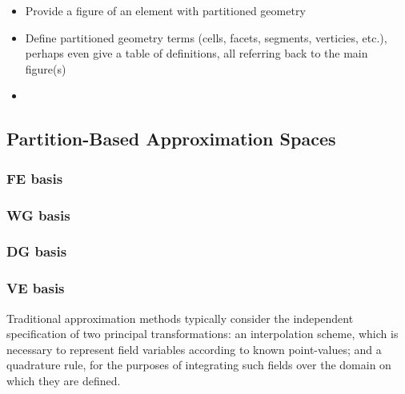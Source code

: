 \begin{itemize}
	\item Provide a figure of an element with partitioned geometry
	\item Define partitioned geometry terms (cells, facets, segments, verticies, etc.), perhaps even give a table of definitions, all referring back to the main figure(s)
	\item 
\end{itemize}

\subsection{Partition-Based Approximation Spaces}

		\subsubsection*{FE basis}
		\subsubsection*{WG basis}
		\subsubsection*{DG basis}
		\subsubsection*{VE basis}

Traditional approximation methods typically consider the independent specification of two principal transformations: an interpolation scheme, which is necessary to represent field variables according to known point-values; and a quadrature rule, for the purposes of integrating such fields over the domain on which they are defined.

